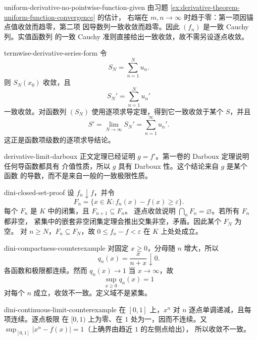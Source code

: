 \begin{solution}{uniform-derivative-no-pointwise-function-given}
由习题 \ref{ex:derivative-theorem-uniform-function-convergence} 的估计，
右端在 \(m,n\to\infty\) 时趋于零：第一项因锚点值收敛而趋零，第二项
因导数列一致收敛而趋零。因此 \((f_n)\) 是一致 Cauchy 列。实值函数列
的一致 Cauchy 准则直接给出一致收敛，故不需另设逐点收敛。
\end{solution}

\begin{solution}{termwise-derivative-series-form}
令
\[
 S_N=\sum_{n=1}^Nu_n.
\]
则 \(S_N(x_0)\) 收敛，且
\[
 S_N'=\sum_{n=1}^Nu_n'
\]
一致收敛。对函数列 \((S_N)\) 使用逐项求导定理，得到它一致收敛于某个
\(S\)，并且
\[
 S'=\lim_{N\to\infty}S_N'=\sum_{n=1}^\infty u_n'.
\]
这正是函数项级数的逐项求导结论。
\end{solution}

\begin{solution}{derivative-limit-darboux}
正文定理已经证明 \(g=f'\)。第一卷的 Darboux 定理说明任何导函数都具有
介值性质，所以 \(g\) 具有 Darboux 性。这个结论来自 \(g\) 是某个函数
的导数，而不是来自一般的一致极限性质。
\end{solution}

\begin{solution}{dini-closed-set-proof}
设 \(f_n\downarrow f\)，并令
\[
 F_n=\{x\in K:f_n(x)-f(x)\ge\varepsilon\}.
\]
每个 \(F_n\) 是 \(K\) 中的闭集，且 \(F_{n+1}\subseteq F_n\)。
逐点收敛说明 \(\bigcap_nF_n=\varnothing\)。若所有 \(F_n\) 都非空，
紧集中的嵌套非空闭集定理会推出交集非空，矛盾。因此某个 \(F_N\) 为空。
对 \(n\ge N\)，\(F_n\subseteq F_N\)，故
\(0\le f_n-f<\varepsilon\) 在 \(K\) 上处处成立。
\end{solution}

\begin{solution}{dini-compactness-counterexample}
对固定 \(x\ge0\)，分母随 \(n\) 增大，所以
\[
 q_n(x)=\frac{x}{n+x}\downarrow0.
\]
各函数和极限都连续。然而 \(q_n(x)\to1\) 当 \(x\to\infty\)，故
\[
 \sup_{x\ge0}q_n(x)=1
\]
对每个 \(n\) 成立，收敛不一致。定义域不是紧集。
\end{solution}

\begin{solution}{dini-continuous-limit-counterexample}
在 \([0,1]\) 上，\(x^n\) 对 \(n\) 逐点单调递减，且每项连续。逐点极限
在 \([0,1)\) 上为零、在 \(1\) 处为一，因而不连续。又
\(\sup_{[0,1]}|x^n-f(x)|=1\)（上确界由趋近 \(1\) 的左侧点给出），
所以收敛不一致。
\end{solution}

